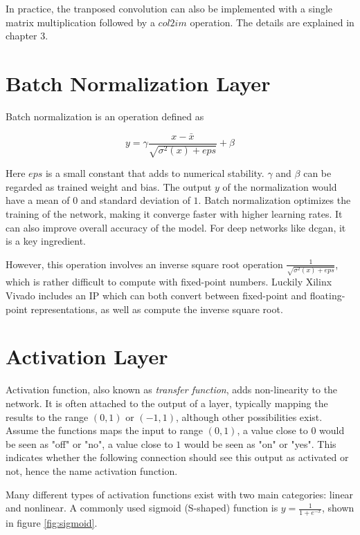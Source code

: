 In practice, the tranposed convolution can also be implemented with a single matrix multiplication
followed by a $col2im$ operation. The details are explained in chapter 3.

\section{Batch Normalization Layer}

Batch normalization is an operation defined as

\begin{equation} \label{eq:batch_normalization}
  y = \gamma \frac{x - \bar{x}}{\sqrt{\sigma^2(x) + {eps}}} + \beta
\end{equation}

Here $eps$ is a small constant that adds to numerical stability. $\gamma$ and $\beta$ can be regarded
as trained weight and bias. The output $y$ of the normalization would have a mean of $0$ and standard
deviation of $1$. Batch normalization optimizes the training of the network, making it converge
faster with higher learning rates. It can also improve overall accuracy of the model. For deep networks
like \gls{dcgan}, it is a key ingredient.

However, this operation involves an inverse square root operation $\frac{1}{\sqrt{\sigma^2(x) + eps}}$,
which is rather difficult to compute with fixed-point numbers. Luckily Xilinx Vivado includes an IP which
can both convert between fixed-point and floating-point representations, as well as compute the inverse square
root.

\section{Activation Layer}

Activation function, also known as \textit{transfer function}, adds non-linearity to the network. It is often
attached to the output of a layer, typically mapping the results to the range $(0, 1)$ or $(-1, 1)$, although
other possibilities exist. Assume the functions maps the input to range $(0, 1)$, a value close to $0$ would
be seen as "off" or "no", a value close to $1$ would be seen as "on" or "yes". This indicates whether the
following connection should see this output as activated or not, hence the name activation function.

Many different types of activation functions exist with two main categories: linear and nonlinear. A commonly
used sigmoid (S-shaped) function is $y = \frac{1}{1 + e^{-x}}$, shown in figure \ref{fig:sigmoid}.

